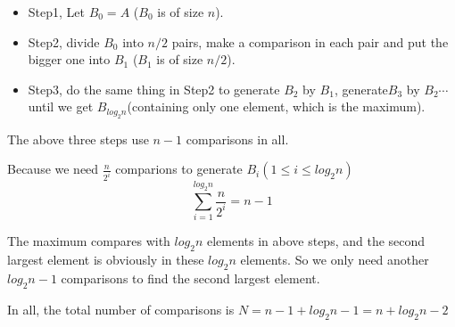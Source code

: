 \begin{itemize}
	\item Step1, Let $B_0 = A$ ($B_0$ is of size $n$).
	\item Step2, divide $B_0$ into $n/2$ pairs, make a comparison in each pair and put the bigger one into $B_1$ ($B_1$ is of size $n/2$).
	\item Step3, do the same thing in Step2 to generate $B_2$ by $B_1$, generate$B_3$ by $B_2 \cdots$ until we get $B_{log_{2}n}$(containing only one element, which is the maximum).
\end{itemize}

\indent The above three steps use $n - 1$ comparisons in all.

Because we need $\displaystyle \frac{n}{2^i}$ comparions to generate $B_i (1\leq i \leq log_{2}n)$
\[\sum_{i = 1} ^ {log_{2}n} \frac{n}{2^i}= n - 1\]

The maximum compares with $log_{2}n$ elements in above steps, and the second largest element is obviously in these $log_{2}n$ elements. So we only need another $log_{2}n - 1$ comparisons to find the second largest element.

In all, the total number of comparisons is $N = n- 1 + log_{2}n - 1 = n + log_{2}n - 2$
